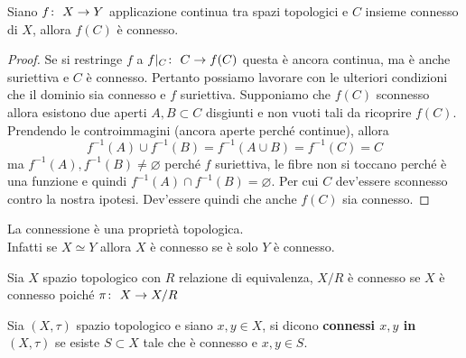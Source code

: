 \begin{theorem}
	\label{thr:3.21.3}
	Siano $f \colon\ X \rightarrow Y$ applicazione continua tra spazi topologici e $C$ insieme connesso di $X$, allora $f(C)$ è connesso. 
\end{theorem} 
\begin{proof}
	Se si restringe $f$ a $f|_C \colon\ C \rightarrow f(C)$ questa è ancora continua, ma è anche suriettiva e $C$ è connesso. Pertanto possiamo lavorare con le ulteriori condizioni che il dominio sia connesso e $f$ suriettiva. Supponiamo che $f(C)$ sconnesso allora esistono due aperti $A, B \subset C$ disgiunti e non vuoti tali da ricoprire $f(C)$. Prendendo le controimmagini (ancora aperte perché continue), allora 
	\begin{equation*}
		f^{-1}(A) \cup f^{-1}(B) = f^{-1}(A \cup B) = f^{-1}(C) = C
	\end{equation*}
	ma $f^{-1}(A), f^{-1}(B) \neq \varnothing$ perché $f$ suriettiva, le fibre non si toccano perché è una funzione e quindi $f^{-1}(A) \cap f^{-1}(B) = \varnothing$. Per cui $C$ dev'essere sconnesso contro la nostra ipotesi. Dev'essere quindi che anche $f(C)$ sia connesso.
\end{proof}

\begin{corollary}
	La connessione è una proprietà topologica. \\ Infatti se $X \simeq Y$ allora $X$ è connesso se è solo $Y$ è connesso. 
\end{corollary}

\begin{corollary}
	Sia $X$ spazio topologico con $R$ relazione di equivalenza, $X/R$ è connesso se $X$ è connesso poiché $\pi \colon\ X \rightarrow X/R$
\end{corollary} 

\begin{definition}
	Sia $(X, \tau)$ spazio topologico e siano $x, y \in X$, si dicono \textbf{connessi $x, y$ in $(X, \tau)$} se esiste $S \subset X$ tale che è connesso e $x, y\in S$.
\end{definition} 

